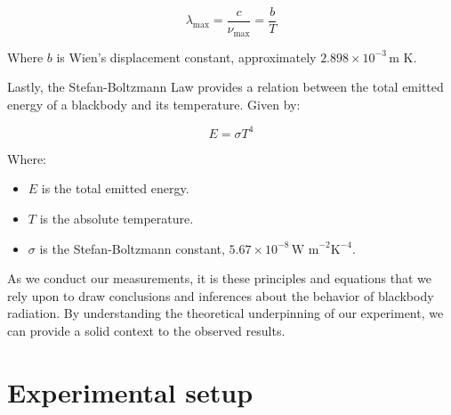 \documentclass[10pt,letterpaper,onecolumn]{article}
\begin{document}
\[ \lambda_{\text{max}} = \frac{c}{\nu_{\text{max}}} = \frac{b}{T} \]

Where \(b\) is Wien's displacement constant, approximately \(2.898 \times 10^{-3} \, \text{m K}\)\cite{wien_law}.

Lastly, the Stefan-Boltzmann Law provides a relation between the total 
emitted energy of a blackbody and its temperature. Given by:

\[ E = \sigma T^4 \]

Where:
\begin{itemize}
  \item \(E\) is the total emitted energy.
  \item \(T\) is the absolute temperature.
  \item \(\sigma\) is the Stefan-Boltzmann constant, \(5.67 \times 10^{-8} \, \text{W m}^{-2} \text{K}^{-4}\)\cite{stefan_boltzmann}.
\end{itemize}

As we conduct our measurements, it is these principles and 
equations that we rely upon to draw conclusions and inferences about the 
behavior of blackbody radiation. By understanding the theoretical underpinning 
of our experiment, we can provide a solid context to the observed results.

\section{Experimental setup}
\end{document}
